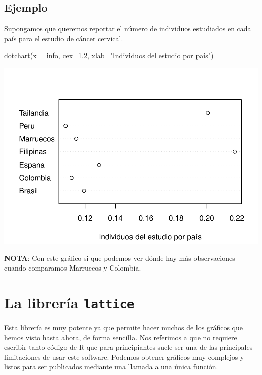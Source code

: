 \documentclass[
]{book}
\newenvironment{Shaded}{\begin{snugshade}}{\end{snugshade}}
\newcommand{\AttributeTok}[1]{\textcolor[rgb]{0.77,0.63,0.00}{#1}}
\newcommand{\FloatTok}[1]{\textcolor[rgb]{0.00,0.00,0.81}{#1}}
\newcommand{\FunctionTok}[1]{\textcolor[rgb]{0.00,0.00,0.00}{#1}}
\newcommand{\NormalTok}[1]{#1}
\newcommand{\StringTok}[1]{\textcolor[rgb]{0.31,0.60,0.02}{#1}}
\begin{document}
\hypertarget{ejemplo-13}{%
\subsection*{Ejemplo}\label{ejemplo-13}}

Supongamos que queremos reportar el número de individuos estudiados en cada país para el estudio de cáncer cervical.

\begin{Shaded}
\begin{Highlighting}[]
\FunctionTok{dotchart}\NormalTok{(}\AttributeTok{x =}\NormalTok{ info, }
         \AttributeTok{cex=}\FloatTok{1.2}\NormalTok{, }\AttributeTok{xlab=}\StringTok{"Individuos del estudio por país"}\NormalTok{)}
\end{Highlighting}
\end{Shaded}

\includegraphics{fig/unnamed-chunk-108-1.pdf}

\textbf{NOTA}: Con este gráfico si que podemos ver dónde hay más observaciones cuando comparamos Marruecos y Colombia.

\hypertarget{la-libreruxeda-lattice}{%
\section{\texorpdfstring{La librería \texttt{lattice}}{La librería lattice}}\label{la-libreruxeda-lattice}}

Esta librería es muy potente ya que permite hacer muchos de los gráficos que hemos visto hasta ahora, de forma sencilla. Nos referimos a que no requiere escribir tanto código de R que para principiantes suele ser una de las principales limitaciones de usar este software. Podemos obtener gráficos muy complejos y listos para ser publicados mediante una llamada a una única función.
\end{document}
